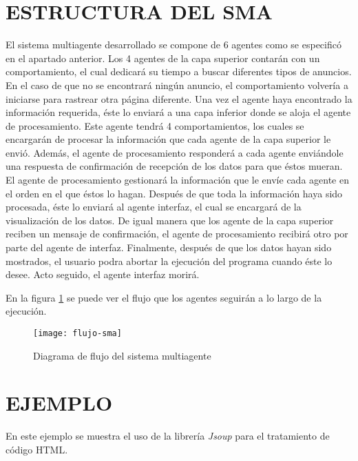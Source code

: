 \documentclass{pre-tfg}
\begin{document}
\section{ESTRUCTURA DEL SMA}
El sistema multiagente desarrollado se compone de 6 agentes como se especificó en el apartado anterior. Los 4 agentes de la capa superior contarán con un comportamiento, el cual dedicará su tiempo a buscar diferentes tipos de anuncios. En el caso de que no se encontrará ningún anuncio, el comportamiento volvería a iniciarse para rastrear otra página diferente. Una vez el agente haya encontrado la información requerida, éste lo enviará a una capa inferior donde se aloja el agente de procesamiento. Este agente tendrá 4 comportamientos, los cuales se encargarán de procesar la información que cada agente de la capa superior le envió. Además, el agente de procesamiento responderá a cada agente enviándole una respuesta de confirmación de recepción de los datos para que éstos mueran. El agente de procesamiento gestionará la información que le envíe cada agente en el orden en el que éstos lo hagan. Después de que toda la información haya sido procesada, éste lo enviará al agente interfaz, el cual se encargará de la visualización de los datos. De igual manera que los agente de la capa superior reciben un mensaje de confirmación, el agente de procesamiento recibirá otro por parte del agente de interfaz. Finalmente, después de que los datos hayan sido mostrados, el usuario podra abortar la ejecución del programa cuando éste lo desee. Acto seguido, el agente interfaz morirá.

En la figura \ref{fig:flujo-sma} se puede ver el flujo que los agentes seguirán a lo largo de la ejecución.

\begin{figure}[h]
    \centering
    \texttt{[image: flujo-sma]}
    \caption{Diagrama de flujo del sistema multiagente}
    \label{fig:flujo-sma}
\end{figure}

\section{EJEMPLO}

En este ejemplo se muestra el uso de la librería \textit{Jsoup} para el tratamiento de código HTML.
\end{document}
